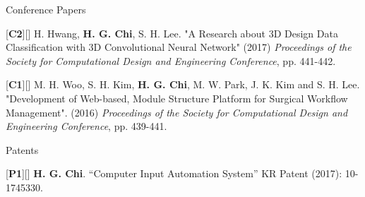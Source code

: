 \begin{cventries}
\cvpub
{Conference Papers} %
{ %
\begin{cvitems}
\item {[\textbf{C2}][\href{https://docs.google.com/viewer?url=https://github.com/stnoah1/CV/raw/master/documents/3DM.pdf}{}] H. Hwang, \textbf{H. G. Chi}, S. H. Lee. "A Research about 3D Design Data Classification with 3D Convolutional Neural Network" (2017) \textit{Proceedings of the Society for Computational Design and Engineering Conference}, pp. 441-442.}
\item {[\textbf{C1}][\href{https://docs.google.com/viewer?url=https://github.com/stnoah1/CV/raw/master/documents/SWORM.pdf}{}] M. H. Woo, S. H. Kim, \textbf{H. G. Chi}, M. W. Park, J. K. Kim and S. H. Lee. "Development of Web-based, Module Structure Platform for Surgical Workflow Management". (2016) \textit{Proceedings of the Society for Computational Design and Engineering Conference}, pp. 439-441.}
\end{cvitems}
}

\cvpub
{Patents}{
\begin{cvitems}
\item {[\textbf{P1}][\href{https://docs.google.com/viewer?url=https://github.com/stnoah1/CV/raw/master/documents/patent.pdf}{}] \textbf{H. G. Chi}.  “Computer Input Automation System” KR Patent (2017): 10-1745330.}
\end{cvitems}
}



\end{cventries}